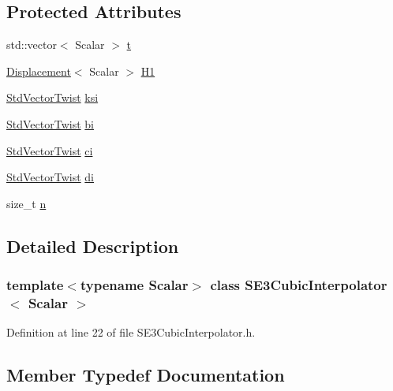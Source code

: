 \subsection*{Protected Attributes}
\begin{DoxyCompactItemize}
\item 
std\+::vector$<$ Scalar $>$ \hyperlink{class_s_e3_cubic_interpolator_ad8083c34a619f3cb55f35ccaffeb6154}{t}
\item 
\hyperlink{class_displacement}{Displacement}$<$ Scalar $>$ \hyperlink{class_s_e3_cubic_interpolator_a57ac720f2b715a74d29472dc9ba4e6f5}{H1}
\item 
\hyperlink{class_s_e3_cubic_interpolator_ae70acde9b57ec38aaf1eaeee50bb35c5}{Std\+Vector\+Twist} \hyperlink{class_s_e3_cubic_interpolator_ab1e8c4aa3aaef4fee220e7ef50f493c1}{ksi}
\item 
\hyperlink{class_s_e3_cubic_interpolator_ae70acde9b57ec38aaf1eaeee50bb35c5}{Std\+Vector\+Twist} \hyperlink{class_s_e3_cubic_interpolator_ad54c52fb731ed48fcebab82d2d6c1c57}{bi}
\item 
\hyperlink{class_s_e3_cubic_interpolator_ae70acde9b57ec38aaf1eaeee50bb35c5}{Std\+Vector\+Twist} \hyperlink{class_s_e3_cubic_interpolator_a45865a05f0ce3a10cfc69b992bee971e}{ci}
\item 
\hyperlink{class_s_e3_cubic_interpolator_ae70acde9b57ec38aaf1eaeee50bb35c5}{Std\+Vector\+Twist} \hyperlink{class_s_e3_cubic_interpolator_ac2edcd8d93807db3f241d49390a2e3dc}{di}
\item 
size\+\_\+t \hyperlink{class_s_e3_cubic_interpolator_a9294008dfdce440c453807ff4f6fee23}{n}
\end{DoxyCompactItemize}


\subsection{Detailed Description}
\subsubsection*{template$<$typename Scalar$>$\newline
class S\+E3\+Cubic\+Interpolator$<$ Scalar $>$}



Definition at line 22 of file S\+E3\+Cubic\+Interpolator.\+h.



\subsection{Member Typedef Documentation}
\hypertarget{class_s_e3_cubic_interpolator_ad6c935ddaa217d370411c200321dc089}{}\label{class_s_e3_cubic_interpolator_ad6c935ddaa217d370411c200321dc089} 
